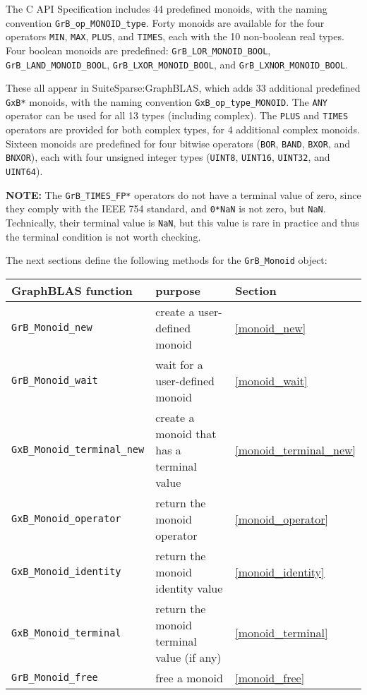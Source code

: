 \documentclass[12pt]{article}
\begin{document}
The C API Specification includes 44 predefined monoids, with the naming
convention \verb'GrB_op_MONOID_type'.  Forty monoids are available for the four
operators \verb'MIN', \verb'MAX', \verb'PLUS', and \verb'TIMES', each with the
10 non-boolean real types.  Four boolean monoids are predefined:
\verb'GrB_LOR_MONOID_BOOL', \verb'GrB_LAND_MONOID_BOOL',
\verb'GrB_LXOR_MONOID_BOOL', and \verb'GrB_LXNOR_MONOID_BOOL'.

These all appear in SuiteSparse:GraphBLAS, which adds 33 additional predefined
\verb'GxB*' monoids, with the naming convention \verb'GxB_op_type_MONOID'.  The
\verb'ANY' operator can be used for all 13 types (including complex).  The
\verb'PLUS' and \verb'TIMES' operators are provided for both complex types, for
4 additional complex monoids.  Sixteen monoids are predefined for four bitwise
operators (\verb'BOR', \verb'BAND', \verb'BXOR', and \verb'BNXOR'), each with
four unsigned integer types (\verb'UINT8', \verb'UINT16', \verb'UINT32', and
\verb'UINT64').

{\bf NOTE:}
The \verb'GrB_TIMES_FP*' operators do not have a terminal value of zero, since
they comply with the IEEE 754 standard, and \verb'0*NaN' is not zero, but
\verb'NaN'.  Technically, their terminal value is \verb'NaN', but this value is
rare in practice and thus the terminal condition is not worth checking.

The next sections define the following methods for the \verb'GrB_Monoid'
object:

\vspace{0.2in}
{\footnotesize
\begin{tabular}{lll}
\hline
GraphBLAS function   & purpose                                      & Section \\
\hline
\verb'GrB_Monoid_new'       & create a user-defined monoid                  & \ref{monoid_new} \\
\verb'GrB_Monoid_wait'      & wait for a user-defined monoid                & \ref{monoid_wait} \\
\verb'GxB_Monoid_terminal_new'  & create a monoid that has a terminal value & \ref{monoid_terminal_new} \\
\verb'GxB_Monoid_operator'  & return the monoid operator                    & \ref{monoid_operator} \\
\verb'GxB_Monoid_identity'  & return the monoid identity value              & \ref{monoid_identity} \\
\verb'GxB_Monoid_terminal'  & return the monoid terminal value (if any)     & \ref{monoid_terminal} \\
\verb'GrB_Monoid_free'      & free a monoid                                 & \ref{monoid_free} \\
\hline
\end{tabular}
}
\vspace{0.2in}
\end{document}
